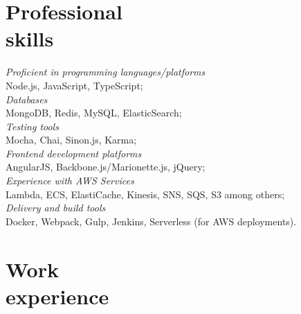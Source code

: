 \documentclass[margin, 10pt]{res} %
\begin{document}
\begin{resume}
\vspace*{-0.5cm}
\section{Professional\\ skills}
{\sl  Proficient in programming languages/platforms}  \\
\-\hspace{0.5cm} Node.js, JavaScript, TypeScript;\\
{\sl Databases }\\
\-\hspace{0.5cm} MongoDB, Redis, MySQL, ElasticSearch; \\
{\sl Testing tools }\\
\-\hspace{0.5cm} Mocha, Chai, Sinon.js, Karma; \\
{\sl Frontend development platforms }\\
\-\hspace{0.5cm} AngularJS,  Backbone.js/Marionette.js, jQuery;\\
{\sl Experience with AWS Services } \\
\-\hspace{0.5cm}  Lambda, ECS,  ElastiCache, Kinesis, SNS, SQS, S3 among others; \\
{\sl Delivery and build tools } \\
\-\hspace{0.5cm} Docker, Webpack, Gulp, Jenkins, Serverless (for AWS deployments).

\section{Work\\ experience}


\end{resume}
\end{document}
